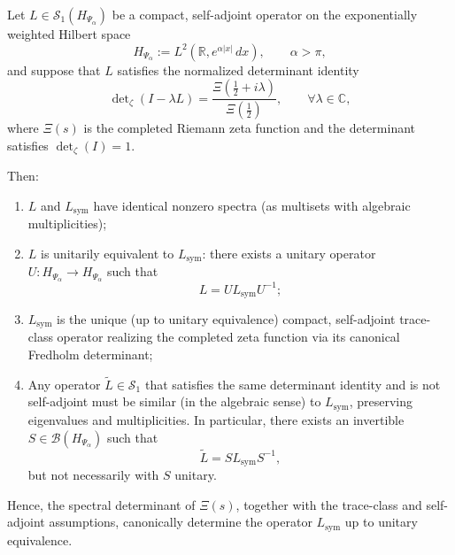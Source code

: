 \begin{lemma}
\label{lem:canonical_closure}
Let \( L \in \mathcal{S}_1(H_{\Psi_\alpha}) \) be a compact, self-adjoint operator on the exponentially weighted Hilbert space
\[
H_{\Psi_\alpha} := L^2(\mathbb{R}, e^{\alpha |x|} \, dx), \qquad \alpha > \pi,
\]
and suppose that \( L \) satisfies the normalized determinant identity
\[
\det\nolimits_\zeta(I - \lambda L) = \frac{\Xi\left(\tfrac{1}{2} + i\lambda\right)}{\Xi\left(\tfrac{1}{2}\right)}, \qquad \forall \lambda \in \mathbb{C},
\]
where \( \Xi(s) \) is the completed Riemann zeta function and the determinant satisfies \( \det_\zeta(I) = 1 \).

\medskip
\noindent
Then:
\begin{enumerate}
  \item \( L \) and \( L_{\mathrm{sym}} \) have identical nonzero spectra (as multisets with algebraic multiplicities);
  \item \( L \) is unitarily equivalent to \( L_{\mathrm{sym}} \): there exists a unitary operator \( U : H_{\Psi_\alpha} \to H_{\Psi_\alpha} \) such that
  \[
  L = U L_{\mathrm{sym}} U^{-1};
  \]
  \item \( L_{\mathrm{sym}} \) is the unique (up to unitary equivalence) compact, self-adjoint trace-class operator realizing the completed zeta function via its canonical Fredholm determinant;
  \item Any operator \( \widetilde{L} \in \mathcal{S}_1 \) that satisfies the same determinant identity and is not self-adjoint must be similar (in the algebraic sense) to \( L_{\mathrm{sym}} \), preserving eigenvalues and multiplicities. In particular, there exists an invertible \( S \in \mathcal{B}(H_{\Psi_\alpha}) \) such that
  \[
  \widetilde{L} = S L_{\mathrm{sym}} S^{-1},
  \]
  but not necessarily with \( S \) unitary.
\end{enumerate}

\medskip
\noindent
Hence, the spectral determinant of \( \Xi(s) \), together with the trace-class and self-adjoint assumptions, canonically determine the operator \( L_{\mathrm{sym}} \) up to unitary equivalence.
\end{lemma}
